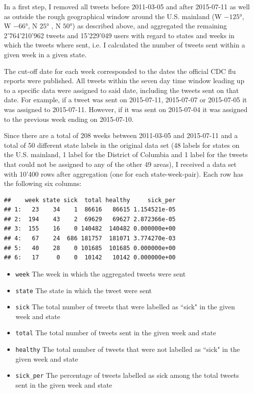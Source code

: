 \documentclass[11pt, a4paper,twoside]{report}\usepackage[]{graphicx}\usepackage[]{color}
\makeatletter
\newenvironment{kframe}{%
 \def\at@end@of@kframe{}%
 \ifinner\ifhmode%
  \def\at@end@of@kframe{\end{minipage}}%
  \begin{minipage}{\columnwidth}%
 \fi\fi%
 \def\FrameCommand##1{\hskip\@totalleftmargin \hskip-\fboxsep
 \colorbox{shadecolor}{##1}\hskip-\fboxsep
     \hskip-\linewidth \hskip-\@totalleftmargin \hskip\columnwidth}%
 \MakeFramed {\advance\hsize-\width
   \@totalleftmargin\z@ \linewidth\hsize
   \@setminipage}}%
 {\par\unskip\endMakeFramed%
 \at@end@of@kframe}
\newenvironment{knitrout}{}{} %
\makeatother
\begin{document}
In a first step, I removed all tweets before 2011-03-05 and after 2015-07-11 as well as outside the rough geographical window around the U.S. mainland (W $-125$°, W $-66$°, N $25$° , N $50$°) as described above, and aggregated the remaining 2'764'210'962 tweets and 15'229'049 users with regard to states and weeks in which the tweets where sent, i.e. I calculated the number of tweets sent within a given week in a given state.

The cut-off date for each week corresponded to the dates the official CDC flu reports were published. All tweets within the seven day time window leading up to a specific data were assigned to said date, including the tweets sent on that date. For example, if a tweet was sent on 2015-07-11, 2015-07-07 or 2015-07-05 it was assigned to 2015-07-11. However, if it was sent on 2015-07-04 it was assigned to the previous week ending on 2015-07-10.

Since there are a total of 208 weeks between 2011-03-05 and 2015-07-11 and a total of 50 different state labels in the original data set (48 labels for states on the U.S. mainland, 1 label for the District of Columbia and 1 label for the tweets that could not be assigned to any of the other 49 areas), I received a data set with 10'400 rows after aggregation (one for each state-week-pair). Each row has the following six columns:

\begin{knitrout}
\color{fgcolor}\begin{kframe}
\begin{verbatim}
##    week state sick  total healthy     sick_per
## 1:   23    34    1  86616   86615 1.154521e-05
## 2:  194    43    2  69629   69627 2.872366e-05
## 3:  155    16    0 140482  140482 0.000000e+00
## 4:   67    24  686 181757  181071 3.774270e-03
## 5:   40    28    0 101685  101685 0.000000e+00
## 6:   17     0    0  10142   10142 0.000000e+00
\end{verbatim}
\end{kframe}
\end{knitrout}

\begin{itemize}
  \item \texttt{week} The week in which the aggregated tweets were sent
  \item \texttt{state} The state in which the tweet were sent
  \item \texttt{sick} The total number of tweets that were labelled as ``sick" in the given week and state
  \item \texttt{total} The total number of tweets sent in the given week and state
  \item \texttt{healthy} The total number of tweets that were not labelled as ``sick" in the given week and state
  \item \texttt{sick\_per} The percentage of tweets labelled as sick among the total tweets sent in the given week and state
\end{itemize}
\end{document}
